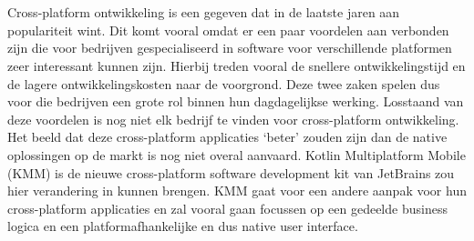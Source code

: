 
\chapter{}
\label{ch:inleiding}

Cross-platform ontwikkeling is een gegeven dat in de laatste jaren aan populariteit wint. Dit komt vooral omdat er een paar voordelen aan verbonden zijn die voor bedrijven gespecialiseerd in software voor verschillende platformen zeer interessant kunnen zijn. Hierbij treden vooral de snellere ontwikkelingstijd en de lagere ontwikkelingskosten naar de voorgrond. Deze twee zaken spelen dus voor die bedrijven een grote rol binnen hun dagdagelijkse werking. Losstaand van deze voordelen is nog niet elk bedrijf te vinden voor cross-platform ontwikkeling. Het beeld dat deze cross-platform applicaties `beter' zouden zijn dan de native oplossingen op de markt is nog niet overal aanvaard. Kotlin Multiplatform Mobile (KMM) is de nieuwe cross-platform software development kit van JetBrains zou hier verandering in kunnen brengen. KMM gaat voor een andere aanpak voor hun cross-platform applicaties en zal vooral gaan focussen op een gedeelde business logica en een platformafhankelijke en dus native user interface. 



